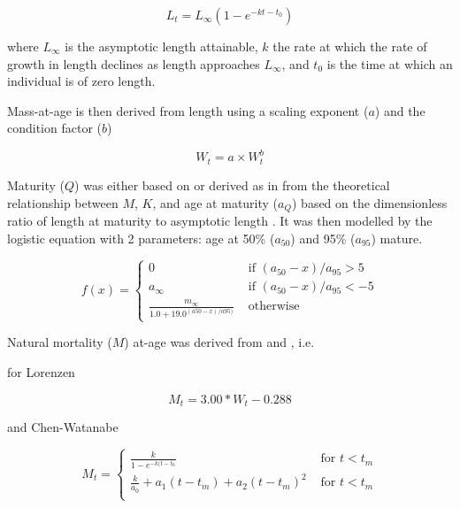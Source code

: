 \documentclass[%
nonumbib,      %
%
]{nrc1}                          %
\begin{document}
\begin{equation} L_t = L_{\infty}(1 - e^{-kt-t_0}) \end{equation} 
 
where $L_{\infty}$ is the asymptotic length attainable, $k$ the rate at which the rate of growth in length declines as length approaches
$L_{\infty}$, and $t_{0}$ is the time at which an individual is of zero length. 
 
Mass-at-age is then derived from length using a scaling exponent ($a$) and the condition factor ($b$)
 
\begin{equation} W_t = a \times W_t^b \end{equation} 
 
Maturity ($Q$) was either based on \cite{santiago2004dinamica}  or derived as in \cite{williams2003implications} 
from the theoretical relationship between $M$, $K$, and age at maturity ($a_{Q}$)  
based on the dimensionless ratio of length at maturity to asymptotic length \citep{beverton1992patterns}. It was then  
modelled by the logistic equation with 2 parameters: age at 50\% ($a_{50}$) and 95\% ($a_{95}$) mature.

\begin{equation}
f(x) = \left\{ \begin{array}{ll}
			0                                 &\mbox{ if $(a_{50}-x)/a_{95} >  5$} \\
			a_{\infty}                        &\mbox{ if $(a_{50}-x)/a_{95} < -5$} \\
			\frac{m_{\infty}}{1.0+19.0^{(a50-x)/{a95})}} &\mbox{ otherwise}
		\end{array}
       \right.
\end{equation}

Natural mortality ($M$) at-age was derived from \cite{lorenzen2002density} and \cite{chen1989age}, i.e.

for Lorenzen
 
\begin{equation}
   M_t=3.00*W_t-0.288
\end{equation}
   
   and Chen-Watanabe
 
\begin{equation}
M_t = \left\{ \begin{array}{ll}
			 \frac{k}{1-e^{-k(t-t_0}}     			&\mbox{ for $t<t_m$} \\
			\frac{k}{a_0}+a_1(t-t_m)+a_2(t-t_m)^2           &\mbox{ for $t<t_m$} \\
		\end{array}
       \right.
\end{equation}
\end{document}
